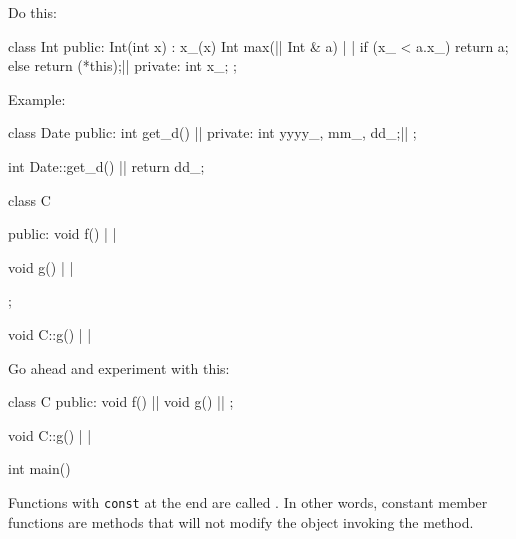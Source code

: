 Do this:

\begin{consolethree}[escapeinside=||]
class Int
{
public:
    Int(int x)
        : x_(x)
    {}
    Int max(|| Int & a) | |
    {
        if (x_ < a.x_)
            return a;
        else
            return (*this);||
    }
private:
    int x_;
};
\end{consolethree}
Example:

\begin{consolethree}[escapeinside=||]
class Date
{
public:
    int get_d() ||
private:
    int yyyy_, mm_, dd_;||
};

int Date::get_d() ||
{
    return dd_;
}
\end{consolethree}



\begin{consolethree}[escapeinside=||]
class C
{
public:
    void f() |  |
    {}
    
    void g() | |
};

void C::g() |  |
{}
\end{consolethree}
Go ahead and experiment with this:

\begin{consolethree}[escapeinside=||]
class C{
public:
    void f() || 
    {}
    void g() || 
};

void C::g() |  |
{}

int main()
{}
\end{consolethree}


Functions with \texttt{const} at the end are called . In other words, constant member functions
are methods that will not modify the object invoking the method.

